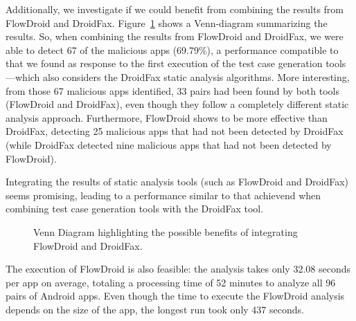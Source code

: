 Additionally, we investigate if we could benefit from combining
the results from FlowDroid and DroidFax. Figure~\ref{fig:venn-plot2} shows a
Venn-diagram summarizing the results. So, when combining
the results from FlowDroid and DroidFax, we were able to detect
67 of the malicious apps (69.79\%), a performance compatible
to that we found as response to the first execution of the
test case generation tools---which also considers the DroidFax
static analysis algorithms. More interesting, from those 67
malicious apps identified, 33 pairs had been found by
both tools (FlowDroid and DroidFax), even though they follow
a completely different static analysis approach. Furthermore,
FlowDroid shows to be more effective than DroidFax, detecting 25 malicious
apps that had not been detected by DroidFax (while DroidFax detected nine
malicious apps that had not been detected by FlowDroid).

\begin{finding}
  Integrating the results of static analysis tools
  (such as FlowDroid and DroidFax) seems promising,
  leading to a performance similar to that achievend
  when combining test case generation tools with the
  DroidFax tool. 
\end{finding}

\begin{figure}
  \caption{Venn Diagram highlighting the possible benefits of
    integrating FlowDroid and DroidFax.}
  \label{fig:venn-plot2}

\end{figure}

The execution of FlowDroid is also feasible: the analysis takes only
32.08 seconds per app on average, totaling a processing time of 52
minutes to analyze all 96 pairs of Android apps.
Even though the time to execute the FlowDroid analysis depends on the size
of the app, the longest run took only 437 seconds. 

